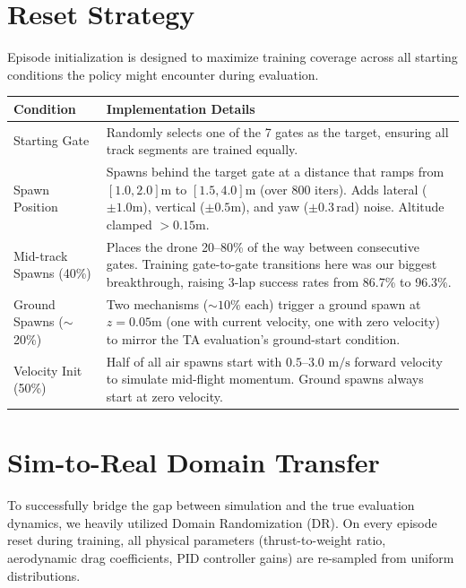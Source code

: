 \documentclass[10pt, twocolumn]{article}
\begin{document}
\section{Reset Strategy}
Episode initialization is designed to maximize training coverage across all starting conditions the policy might encounter during evaluation.

\begin{table}[ht!]
\centering
\small
\begin{tabular}{@{}p{2.5cm} p{5.2cm}@{}}
\toprule
\textbf{Condition} & \textbf{Implementation Details} \\
\midrule
Starting Gate & Randomly selects one of the 7 gates as the target, ensuring all track segments are trained equally. \\ \addlinespace
Spawn Position & Spawns behind the target gate at a distance that ramps from $[1.0, 2.0]\text{m}$ to $[1.5, 4.0]\text{m}$ (over 800 iters). Adds lateral ($\pm1.0\text{m}$), vertical ($\pm0.5\text{m}$), and yaw ($\pm0.3$\,rad) noise. Altitude clamped $>0.15\text{m}$. \\ \addlinespace
Mid-track Spawns (40\%) & Places the drone 20--80\% of the way between consecutive gates. Training gate-to-gate transitions here was our biggest breakthrough, raising 3-lap success rates from 86.7\% to 96.3\%. \\ \addlinespace
Ground Spawns ($\sim$20\%) & Two mechanisms ($\sim10\%$ each) trigger a ground spawn at $z = 0.05\text{m}$ (one with current velocity, one with zero velocity) to mirror the TA evaluation's ground-start condition. \\ \addlinespace
Velocity Init (50\%) & Half of all air spawns start with $0.5$--$3.0\text{ m/s}$ forward velocity to simulate mid-flight momentum. Ground spawns always start at zero velocity. \\
\bottomrule
\end{tabular}
\end{table}

\section{Sim-to-Real Domain Transfer}
To successfully bridge the gap between simulation and the true evaluation dynamics, we heavily utilized Domain Randomization (DR). On every episode reset during training, all physical parameters (thrust-to-weight ratio, aerodynamic drag coefficients, PID controller gains) are re-sampled from uniform distributions. 
\end{document}
